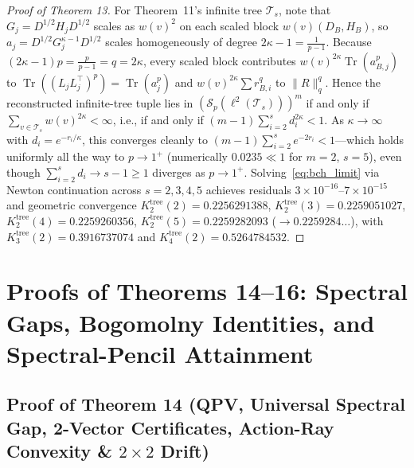 \documentclass[10pt,letterpaper]{article}
\newcommand{\Sp}{\mathcal{S}_p}
\newcommand{\Tr}{\operatorname{Tr}}
\begin{document}
\begin{proof}[Proof of Theorem 13]
For Theorem~11's infinite tree $\mathcal{T}_s$, note that $G_j = D^{1/2} H_j D^{1/2}$ scales as $w(v)^2$ on each scaled block $w(v)(D_B, H_B)$, so $a_j = D^{1/2} G_j^{\kappa-1} D^{1/2}$ scales homogeneously of degree $2\kappa - 1 = \frac{1}{p - 1}$. Because $(2\kappa - 1)p = \frac{p}{p-1} = q = 2\kappa$, every scaled block contributes $w(v)^{2\kappa}\Tr(a_{B,j}^p)$ to $\Tr((L_j L_j^\top)^p) = \Tr(a_j^p)$ and $w(v)^{2\kappa}\sum r_{B,i}^q$ to $\|R\|_q^q$. Hence the reconstructed infinite-tree tuple lies in $(\Sp(\ell^2(\mathcal{T}_s)))^m$ if and only if $\sum_{v \in \mathcal{T}_s} w(v)^{2\kappa} < \infty$, i.e., if and only if $(m - 1)\sum_{i=2}^s d_i^{2\kappa} < 1$. As $\kappa \to \infty$ with $d_i = e^{-r_i/\kappa}$, this converges cleanly to $(m - 1)\sum_{i=2}^s e^{-2r_i} < 1$—which holds uniformly all the way to $p \to 1^+$ (numerically $0.0235 \ll 1$ for $m = 2$, $s = 5$), even though $\sum_{i=2}^s d_i \to s - 1 \ge 1$ diverges as $p \to 1^+$. Solving~\eqref{eq:bch_limit} via Newton continuation across $s = 2, 3, 4, 5$ achieves residuals $3\times 10^{-16}$--$7\times 10^{-15}$ and geometric convergence $K_2^{\mathrm{tree}}(2) = 0.2256291388$, $K_2^{\mathrm{tree}}(3) = 0.2259051027$, $K_2^{\mathrm{tree}}(4) = 0.2259260356$, $K_2^{\mathrm{tree}}(5) = 0.2259282093$ ($\to 0.2259284\dots$), with $K_3^{\mathrm{tree}}(2) = 0.3916737074$ and $K_4^{\mathrm{tree}}(2) = 0.5264784532$.
\end{proof}

\section{Proofs of Theorems 14--16: Spectral Gaps, Bogomolny Identities, and Spectral-Pencil Attainment}

\subsection{Proof of Theorem 14 (QPV, Universal Spectral Gap, 2-Vector Certificates, Action-Ray Convexity \& \texorpdfstring{$2\times 2$}{2x2} Drift)}
\end{document}
